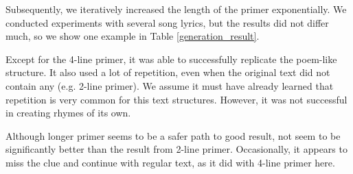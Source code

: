 Subsequently, we iteratively increased the length of the primer exponentially. We conducted experiments with several song lyrics, but the results did not differ  much, so we  show one example in Table \ref{generation_result}.

Except for the 4-line primer, it was able to successfully replicate the poem-like structure. It also used a lot of repetition, even when the original text did not contain any (e.g.  2-line primer). We assume\deleted{,} it must have already learned that repetition is very common for this  text structures. However, it was not successful in creating rhymes of its own.

Although longer primer seems to be a safer path to good result,  not seem to be significantly better than the result from  2-line primer. Occasionally, it appears to miss the clue and continue with regular text, as it did with  4-line primer here.



